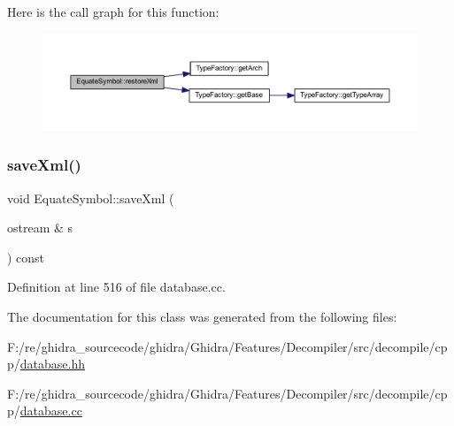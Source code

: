 Here is the call graph for this function\+:
\nopagebreak
\begin{figure}[H]
\begin{center}
\leavevmode
\includegraphics[width=350pt]{class_equate_symbol_ab4aa7cdacdd28777f82bf0be1ad55454_cgraph}
\end{center}
\end{figure}
\mbox{\label{class_equate_symbol_ac116a5483c48693a6c252687c0319739}} 
\subsubsection{\texorpdfstring{saveXml()}{saveXml()}}
{\footnotesize\ttfamily void Equate\+Symbol\+::save\+Xml (\begin{DoxyParamCaption}\item[{ostream \&}]{s }\end{DoxyParamCaption}) const\hspace{0.3cm}{\ttfamily [virtual]}}



Definition at line 516 of file database.\+cc.



The documentation for this class was generated from the following files\+:\begin{DoxyCompactItemize}
\item 
F\+:/re/ghidra\+\_\+sourcecode/ghidra/\+Ghidra/\+Features/\+Decompiler/src/decompile/cpp/\mbox{\hyperlink{database_8hh}{database.\+hh}}\item 
F\+:/re/ghidra\+\_\+sourcecode/ghidra/\+Ghidra/\+Features/\+Decompiler/src/decompile/cpp/\mbox{\hyperlink{database_8cc}{database.\+cc}}\end{DoxyCompactItemize}
